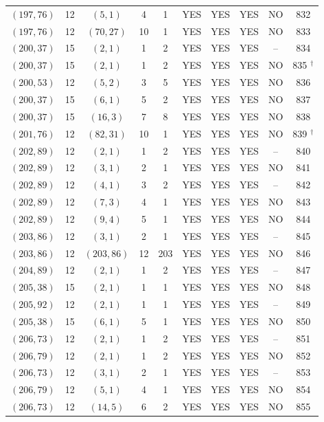 \begin{longtable}{|c|c|c|c|c|c|c|c|c|c|}
$(197, 76)$ & 12 & $(5, 1)$ & 4 & 1 & YES & YES & YES & NO & 832\\
$(197, 76)$ & 12 & $(70, 27)$ & 10 & 1 & YES & YES & YES & NO & 833\\
$(200, 37)$ & 15 & $(2, 1)$ & 1 & 2 & YES & YES & YES & -- & 834\\
$(200, 37)$ & 15 & $(2, 1)$ & 1 & 2 & YES & YES & YES & NO & 835 ${}^\dagger$\\
$(200, 53)$ & 12 & $(5, 2)$ & 3 & 5 & YES & YES & YES & NO & 836\\
$(200, 37)$ & 15 & $(6, 1)$ & 5 & 2 & YES & YES & YES & NO & 837\\
$(200, 37)$ & 15 & $(16, 3)$ & 7 & 8 & YES & YES & YES & NO & 838\\
$(201, 76)$ & 12 & $(82, 31)$ & 10 & 1 & YES & YES & YES & NO & 839 ${}^\dagger$\\
$(202, 89)$ & 12 & $(2, 1)$ & 1 & 2 & YES & YES & YES & -- & 840\\
$(202, 89)$ & 12 & $(3, 1)$ & 2 & 1 & YES & YES & YES & NO & 841\\
$(202, 89)$ & 12 & $(4, 1)$ & 3 & 2 & YES & YES & YES & -- & 842\\
$(202, 89)$ & 12 & $(7, 3)$ & 4 & 1 & YES & YES & YES & NO & 843\\
$(202, 89)$ & 12 & $(9, 4)$ & 5 & 1 & YES & YES & YES & NO & 844\\
$(203, 86)$ & 12 & $(3, 1)$ & 2 & 1 & YES & YES & YES & -- & 845\\
$(203, 86)$ & 12 & $(203, 86)$ & 12 & 203 & YES & YES & YES & NO & 846\\
$(204, 89)$ & 12 & $(2, 1)$ & 1 & 2 & YES & YES & YES & -- & 847\\
$(205, 38)$ & 15 & $(2, 1)$ & 1 & 1 & YES & YES & YES & NO & 848\\
$(205, 92)$ & 12 & $(2, 1)$ & 1 & 1 & YES & YES & YES & -- & 849\\
$(205, 38)$ & 15 & $(6, 1)$ & 5 & 1 & YES & YES & YES & NO & 850\\
$(206, 73)$ & 12 & $(2, 1)$ & 1 & 2 & YES & YES & YES & -- & 851\\
$(206, 79)$ & 12 & $(2, 1)$ & 1 & 2 & YES & YES & YES & NO & 852\\
$(206, 73)$ & 12 & $(3, 1)$ & 2 & 1 & YES & YES & YES & -- & 853\\
$(206, 79)$ & 12 & $(5, 1)$ & 4 & 1 & YES & YES & YES & NO & 854\\
$(206, 73)$ & 12 & $(14, 5)$ & 6 & 2 & YES & YES & YES & NO & 855\\

\end{longtable}

